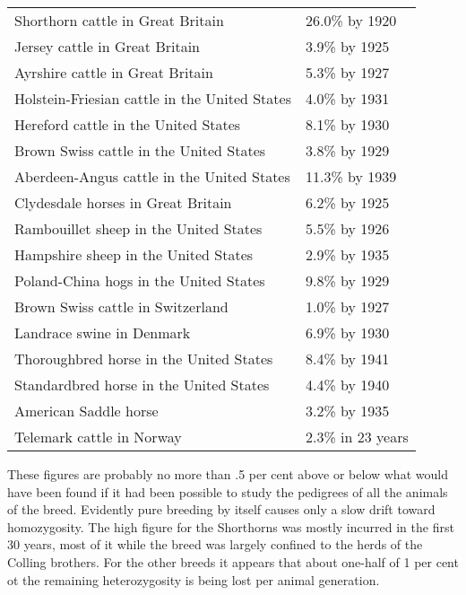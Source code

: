 \begin{table}[h]
	\centering
	\begin{tabular}{L{8cm}R{3cm}}
	Shorthorn cattle in Great Britain 				& 26.0\% by 1920 \\
	Jersey cattle in Great Britain 					& 3.9\% by 1925 \\
	Ayrshire cattle in Great Britain 				& 5.3\% by 1927 \\
	Holstein-Friesian cattle in the United States	& 4.0\% by 1931 \\
	Hereford cattle in the United States 			& 8.1\% by 1930 \\
	Brown Swiss cattle in the United States 		& 3.8\% by 1929 \\
	Aberdeen-Angus cattle in the United States 		& 11.3\% by 1939 \\
	Clydesdale horses in Great Britain 				& 6.2\% by 1925 \\
	Rambouillet sheep in the United States 			& 5.5\% by 1926 \\
	Hampshire sheep in the United States 			& 2.9\% by 1935 \\
	Poland-China hogs in the United States			& 9.8\% by 1929 \\
	Brown Swiss cattle in Switzerland				& 1.0\% by 1927 \\
	Landrace swine in Denmark						& 6.9\% by 1930 \\
	Thoroughbred horse in the United States 		& 8.4\% by 1941 \\
	Standardbred horse in the United States			& 4.4\% by 1940 \\
	American Saddle horse							& 3.2\% by 1935 \\
	Telemark cattle in Norway						& 2.3\% in 23 years
	\end{tabular}
\end{table}

\noindent
These figures are probably no more than .5 per cent above or below
what would have been found if it had been possible to study the pedigrees
of all the animals of the breed. Evidently pure breeding by itself
causes only a slow drift toward homozygosity. The high figure for the
Shorthorns was mostly incurred in the first 30 years, most of it while
the breed was largely confined to the herds of the Colling brothers. For
the other breeds it appears that about one-half of 1 per cent ot the
remaining heterozygosity is being lost per animal generation.

